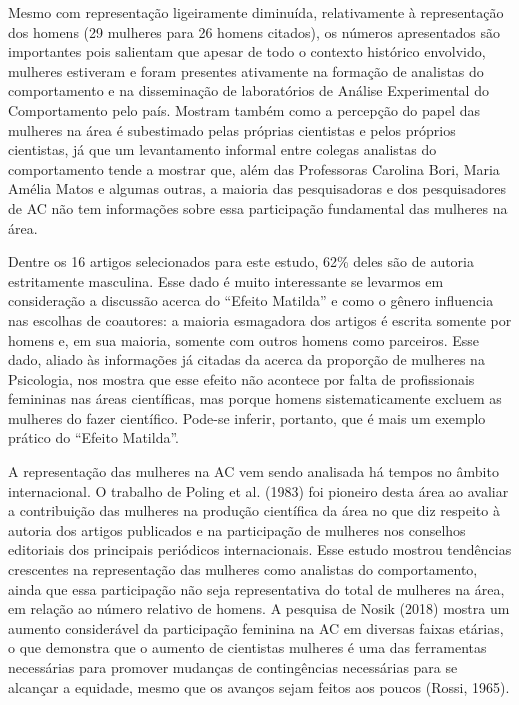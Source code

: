 Mesmo com representação ligeiramente diminuída, relativamente à representação dos homens (29 mulheres para 26 homens citados), os números apresentados são importantes pois salientam que apesar de todo o contexto histórico envolvido, mulheres estiveram e foram presentes ativamente na formação de analistas do comportamento e na disseminação de laboratórios de Análise Experimental do Comportamento pelo país. Mostram também como a percepção do papel das mulheres na área é subestimado pelas próprias cientistas e pelos próprios cientistas, já que um levantamento informal entre colegas analistas do comportamento tende a mostrar que, além das Professoras Carolina Bori, Maria Amélia Matos e algumas outras, a maioria das pesquisadoras e dos pesquisadores de AC não tem informações sobre essa participação fundamental das mulheres na área.

Dentre os 16 artigos selecionados para este estudo, 62\% deles são de autoria estritamente masculina.  Esse dado é muito interessante se levarmos em consideração a discussão acerca do “Efeito Matilda” e como o gênero influencia nas escolhas de coautores: a maioria esmagadora dos artigos é escrita somente por homens e, em sua maioria, somente com outros homens como parceiros. Esse dado, aliado às informações já citadas da acerca da proporção de mulheres na Psicologia, nos mostra que esse efeito não acontece por falta de profissionais femininas nas áreas científicas, mas porque homens sistematicamente excluem as mulheres do fazer científico. Pode-se inferir, portanto, que é mais um exemplo prático do “Efeito Matilda”.

A representação das mulheres na AC vem sendo analisada há tempos no âmbito internacional. O trabalho de Poling et al. (1983) foi pioneiro desta área ao avaliar a contribuição das mulheres na produção científica da área no que diz respeito à autoria dos artigos publicados e na participação de mulheres nos conselhos editoriais dos principais periódicos internacionais. Esse estudo mostrou tendências crescentes na representação das mulheres como analistas do comportamento, ainda que essa participação não seja representativa do total de mulheres na área, em relação ao número relativo de homens. A pesquisa de Nosik (2018) mostra um aumento considerável da participação feminina na AC em diversas faixas etárias, o que demonstra que o aumento de cientistas mulheres é uma das ferramentas necessárias para promover mudanças de contingências necessárias para se alcançar a equidade, mesmo que os avanços sejam feitos aos poucos (Rossi, 1965).

